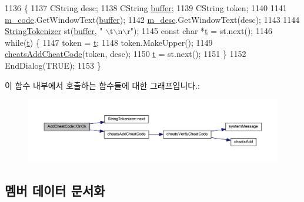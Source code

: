 \begin{DoxyCode}
1136 \{
1137   CString desc;
1138   CString \mbox{\hyperlink{_g_b_a_8cpp_a28d4d3d8445e73a696b2d6f7eadabd96}{buffer}};
1139   CString token;
1140 
1141   \mbox{\hyperlink{class_add_cheat_code_a9ae1d05acf10bc6fc8ea8cce2ec2cc6a}{m\_code}}.GetWindowText(\mbox{\hyperlink{_g_b_a_8cpp_a28d4d3d8445e73a696b2d6f7eadabd96}{buffer}});
1142   \mbox{\hyperlink{class_add_cheat_code_a5bbe6b54e71db26da7b3abc7449b3342}{m\_desc}}.GetWindowText(desc);
1143   
1144   \mbox{\hyperlink{class_string_tokenizer}{StringTokenizer}} st(\mbox{\hyperlink{_g_b_a_8cpp_a28d4d3d8445e73a696b2d6f7eadabd96}{buffer}}, \textcolor{stringliteral}{" \(\backslash\)t\(\backslash\)n\(\backslash\)r"});
1145   \textcolor{keyword}{const} \textcolor{keywordtype}{char} *\mbox{\hyperlink{expr_8cpp_aded116371789db1fd63c90ef00c95a3d}{t}} = st.next();
1146   \textcolor{keywordflow}{while}(\mbox{\hyperlink{expr_8cpp_aded116371789db1fd63c90ef00c95a3d}{t}}) \{
1147     token = \mbox{\hyperlink{expr_8cpp_aded116371789db1fd63c90ef00c95a3d}{t}};
1148     token.MakeUpper();
1149     \mbox{\hyperlink{_cheats_8cpp_a0e87699a326f10639902f59174a7e6ee}{cheatsAddCheatCode}}(token, desc);
1150     \mbox{\hyperlink{expr_8cpp_aded116371789db1fd63c90ef00c95a3d}{t}} = st.next();
1151   \}
1152   EndDialog(TRUE);
1153 \}
\end{DoxyCode}
이 함수 내부에서 호출하는 함수들에 대한 그래프입니다.\+:
\nopagebreak
\begin{figure}[H]
\begin{center}
\leavevmode
\includegraphics[width=350pt]{class_add_cheat_code_a77b1ec1f5e067495aef92a2f9b8750c8_cgraph}
\end{center}
\end{figure}


\subsection{멤버 데이터 문서화}
\mbox{\label{class_add_cheat_code_a9ae1d05acf10bc6fc8ea8cce2ec2cc6a}} 
